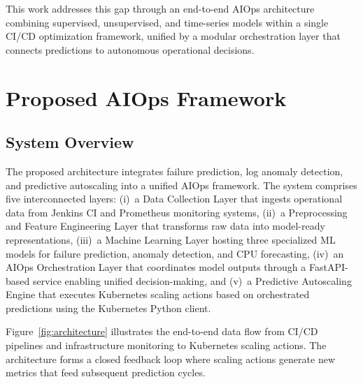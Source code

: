 \documentclass[sn-nature]{sn-jnl}
\theoremstyle{thmstyleone}
\theoremstyle{thmstyletwo}
\theoremstyle{thmstylethree}
\begin{document}
This work addresses this gap through an end-to-end AIOps architecture combining supervised, unsupervised, and time-series models within a single CI/CD optimization framework, unified by a modular orchestration layer that connects predictions to autonomous operational decisions.

\section{Proposed AIOps Framework}\label{sec:framework}

\subsection{System Overview}\label{subsec:overview}

The proposed architecture integrates failure prediction, log anomaly detection, and predictive autoscaling into a unified AIOps framework. The system comprises five interconnected layers: (i)~a Data Collection Layer that ingests operational data from Jenkins CI and Prometheus monitoring systems, (ii)~a Preprocessing and Feature Engineering Layer that transforms raw data into model-ready representations, (iii)~a Machine Learning Layer hosting three specialized ML models for failure prediction, anomaly detection, and CPU forecasting, (iv)~an AIOps Orchestration Layer that coordinates model outputs through a FastAPI-based service enabling unified decision-making, and (v)~a Predictive Autoscaling Engine that executes Kubernetes scaling actions based on orchestrated predictions using the Kubernetes Python client.

Figure~\ref{fig:architecture} illustrates the end-to-end data flow from CI/CD pipelines and infrastructure monitoring to Kubernetes scaling actions. The architecture forms a closed feedback loop where scaling actions generate new metrics that feed subsequent prediction cycles.
\end{document}
